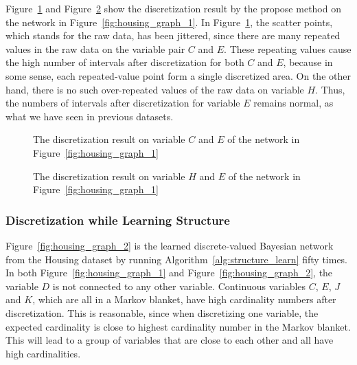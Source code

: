 \begin{table}
  \centering
  \scalebox{1.0}{
  
  }
  \caption{Discretization result of Housing dataset based on the graph Figure~\ref{fig:housing_graph_1} }
  \label{table:housing_disc_table_1}
\end{table}

Figure~\ref{fig:housing_exp1_distr_3_5} and Figure~\ref{fig:housing_exp1_distr_8_5} show the discretization result by the propose method on the network in Figure~\ref{fig:housing_graph_1}.
In Figure~\ref{fig:housing_exp1_distr_3_5}, the scatter points, which stands for the raw data, has been jittered, since there are many repeated values in the raw data on the variable pair $C$ and $E$. These repeating values cause the high number of intervals after discretization for both $C$ and $E$, because in some sense, each repeated-value point form a single discretized area. On the other hand, there is no such over-repeated values of the raw data on variable $H$. Thus, the numbers of intervals after discretization for variable $E$ remains normal, as what we have seen in previous datasets.

\begin{figure}[ht]
      
  \caption{The discretization result on variable $C$ and $E$ of the network in Figure~\ref{fig:housing_graph_1}}
  \label{fig:housing_exp1_distr_3_5}
\end{figure}

\begin{figure}[ht]
    
  \caption{The discretization result on variable $H$ and $E$ of the network in Figure~\ref{fig:housing_graph_1}}
  \label{fig:housing_exp1_distr_8_5}
\end{figure}

\subsubsection{Discretization while Learning Structure}
\label{subsubsec:housing_exp2}

Figure~\ref{fig:housing_graph_2} is the learned discrete-valued Bayesian network from the Housing dataset by running Algorithm~\ref{alg:structure_learn} fifty times.
In both Figure~\ref{fig:housing_graph_1} and Figure~\ref{fig:housing_graph_2}, the variable $D$ is not connected to any other variable.
Continuous variables $C$, $E$, $J$ and $K$, which are all in a Markov blanket, have high cardinality numbers after discretization.
This is reasonable, since when discretizing one variable, the expected cardinality is close to highest cardinality number in the Markov blanket.
This will lead to a group of variables that are close to each other and all have high cardinalities.

